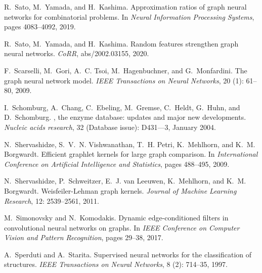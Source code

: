\documentclass{article}
\theoremstyle{definition}
\begin{document}
\begin{thebibliography}{125}
	R.~Sato, M.~Yamada, and H.~Kashima.
	\newblock Approximation ratios of graph neural networks for combinatorial
	problems.
	\newblock In \emph{Neural Information Processing Systems}, pages 4083--4092,
	2019.
	
	R.~Sato, M.~Yamada, and H.~Kashima.
	\newblock Random features strengthen graph neural networks.
	\newblock \emph{CoRR}, abs/2002.03155, 2020.
	
	F.~Scarselli, M.~Gori, A.~C. Tsoi, M.~Hagenbuchner, and G.~Monfardini.
	\newblock The graph neural network model.
	\newblock \emph{IEEE Transactions on Neural Networks}, 20
	(1): 61--80, 2009.
	
	I.~Schomburg, A.~Chang, C.~Ebeling, M.~Gremse, C.~Heldt, G.~Huhn, and
	D.~Schomburg.
	, the enzyme database: updates and major new developments.
	\newblock \emph{Nucleic acids research}, 32 (Database issue):
	D431—3, January 2004.
	
	N.~Shervashidze, S.~V.~N. Vishwanathan, T.~H. Petri, K.~Mehlhorn, and K.~M.
	Borgwardt.
	\newblock Efficient graphlet kernels for large graph comparison.
	\newblock In \emph{International Conference on Artificial Intelligence and
		Statistics}, pages 488--495, 2009.
	
	N.~Shervashidze, P.~Schweitzer, E.~J. van Leeuwen, K.~Mehlhorn, and K.~M.
	Borgwardt.
	\newblock Weisfeiler-{L}ehman graph kernels.
	\newblock \emph{Journal of Machine Learning Research}, 12: 2539--2561,
	2011.
	
	M.~Simonovsky and N.~Komodakis.
	\newblock Dynamic edge-conditioned filters in convolutional neural networks on
	graphs.
	\newblock In \emph{IEEE Conference on Computer Vision and Pattern Recognition},
	pages 29--38, 2017.
	
	A.~Sperduti and A.~Starita.
	\newblock Supervised neural networks for the classification of structures.
	\newblock \emph{IEEE Transactions on Neural Networks}, 8 (2):
	714--35, 1997.
	

\end{thebibliography}
\end{document}
